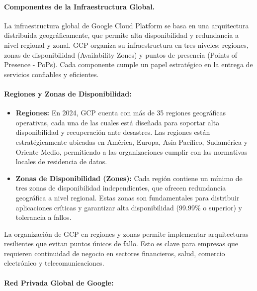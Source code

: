 {                \paragraph{Componentes de la Infraestructura Global.} La infraestructura global de Google Cloud Platform se basa en una arquitectura distribuida geográficamente, que permite alta disponibilidad y redundancia a nivel regional y zonal. GCP organiza su infraestructura en tres niveles: regiones, zonas de disponibilidad (Availability Zones) y puntos de presencia (Points of Presence - PoPs). Cada componente cumple un papel estratégico en la entrega de servicios confiables y eficientes.
                
                \paragraph{Regiones y Zonas de Disponibilidad:}
                
                \begin{itemize}
                    \item \textbf{Regiones:} En 2024, GCP cuenta con más de 35 regiones geográficas operativas, cada una de las cuales está diseñada para soportar alta disponibilidad y recuperación ante desastres. Las regiones están estratégicamente ubicadas en América, Europa, Asia-Pacífico, Sudamérica y Oriente Medio, permitiendo a las organizaciones cumplir con las normativas locales de residencia de datos.
                    \item \textbf{Zonas de Disponibilidad (Zones):} Cada región contiene un mínimo de tres zonas de disponibilidad independientes, que ofrecen redundancia geográfica a nivel regional. Estas zonas son fundamentales para distribuir aplicaciones críticas y garantizar alta disponibilidad (99.99\% o superior) y tolerancia a fallos.
                \end{itemize}
                
                La organización de GCP en regiones y zonas permite implementar arquitecturas resilientes que evitan puntos únicos de fallo. Esto es clave para empresas que requieren continuidad de negocio en sectores financieros, salud, comercio electrónico y telecomunicaciones.
                
                \paragraph{Red Privada Global de Google:}
                
}
